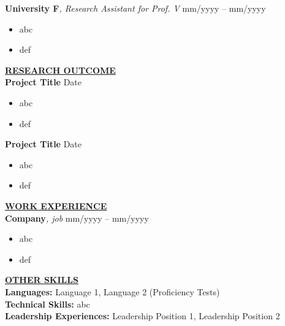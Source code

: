 \documentclass{article}
\begin{document}
\noindent \textbf{University F}\textit{, Research Assistant for Prof. V} \hfill mm/yyyy -- mm/yyyy
\begin{itemize}[noitemsep,nolistsep,leftmargin=*]
\item {abc}
\item {def}
\end{itemize}

\noindent \textbf{\underline{RESEARCH OUTCOME}} \\
\noindent \textbf{Project Title} \hfill Date
\begin{itemize}[noitemsep,nolistsep,leftmargin=*]
\item {abc}
\item {def}
\end{itemize}

\noindent \textbf{Project Title} \hfill Date
\begin{itemize}[noitemsep,nolistsep,leftmargin=*]
\item {abc}
\item {def}
\end{itemize}

\noindent \textbf{\underline{WORK EXPERIENCE}} \\
\noindent \textbf{Company}\textit{, job} \hfill mm/yyyy -- mm/yyyy
\begin{itemize}[noitemsep,nolistsep,leftmargin=*]
\item {abc}
\item {def}
\end{itemize}

\noindent \textbf{\underline{OTHER SKILLS}} \\
\noindent \textbf{Languages:} Language 1, Language 2 (Proficiency Tests) \\
\noindent \textbf{Technical Skills:} abc \\
\noindent \textbf{Leadership Experiences:} Leadership Position 1, Leadership Position 2 \\
\end{document}
